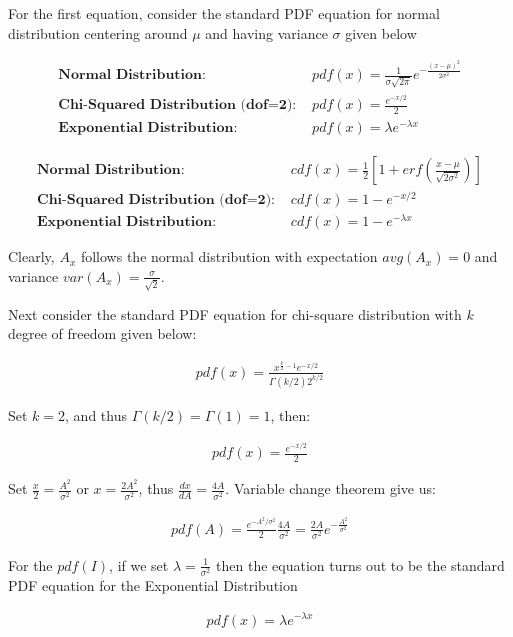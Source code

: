 For the first equation, consider the standard PDF equation for normal distribution centering around $\mu$ and having variance $\sigma$ given below

\begin{align}
\textbf{Normal Distribution: } & pdf(x) = \frac{1}{\sigma \sqrt{2\pi}} e^{- \frac{(x-\mu)^2}{2 \sigma^2}} \\
\textbf{Chi-Squared Distribution (dof=2): } & pdf(x) = \frac{e^{-x/2}}{2} \\ %
\textbf{Exponential Distribution: } & pdf(x) = \lambda e^{- \lambda x}
\end{align}

\begin{align}
\textbf{Normal Distribution: } & cdf(x) = \frac{1}{2} \left[ 1 + erf \left( \frac{x-\mu}{\sqrt{2\sigma^2}} \right) \right] \\
\textbf{Chi-Squared Distribution (dof=2): } & cdf(x) = 1 - e^{-x/2}\\
\textbf{Exponential Distribution: } & cdf(x) = 1 - e^{- \lambda x}
\end{align}

Clearly, $A_x$ follows the normal distribution with expectation $avg(A_x)=0$ and variance $var(A_x)=\frac{\sigma}{\sqrt{2}}$.

Next consider the standard PDF equation for chi-square distribution with $k$ degree of freedom given below:

\begin{align}
pdf(x) = \frac{x^{\frac{k}{2}-1}e^{-x/2}}{\Gamma(k/2)2^{k/2}}
\end{align}

Set $k=2$, and thus $\Gamma(k/2)=\Gamma(1)=1$, then:

\begin{align}
pdf(x) = \frac{e^{-x/2}}{2} 
\end{align}

Set $\frac{x}{2} = \frac{A^2}{\sigma^2}$ or $x = \frac{2A^2}{\sigma^2}$, thus $\frac{dx}{dA} = \frac{4A}{\sigma^2}$.
Variable change theorem give us:

\begin{align}
pdf(A) = \frac{e^{-A^2/\sigma^2}}{2} \frac{4A}{\sigma^2} = \frac{2A}{\sigma^2} e^{-\frac{A^2}{\sigma^2}}
\end{align}


For the $pdf(I)$, if we set $\lambda = \frac{1}{\sigma^2}$ then the equation turns out to be the standard PDF equation for the Exponential Distribution 

\begin{align}
pdf(x) = \lambda e^{- \lambda x}
\end{align}
